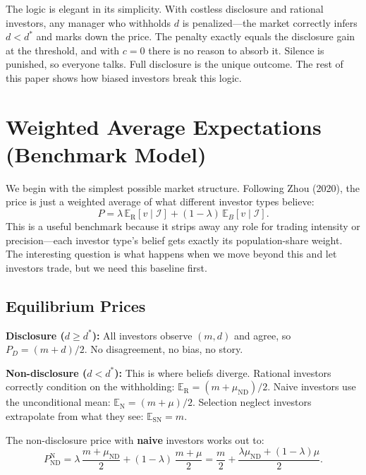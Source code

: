 \documentclass[12pt]{article}
\theoremstyle{plain}
\theoremstyle{definition}
\newcommand{\E}{\mathbb{E}}
\newcommand{\ND}{\mathrm{ND}}
\newcommand{\R}{\mathrm{R}}
\newcommand{\SN}{\mathrm{SN}}
\newcommand{\N}{\mathrm{N}}
\begin{document}
The logic is elegant in its simplicity. With costless disclosure and rational investors, any manager who withholds $d$ is penalized---the market correctly infers $d < d^*$ and marks down the price. The penalty exactly equals the disclosure gain at the threshold, and with $c = 0$ there is no reason to absorb it. Silence is punished, so everyone talks. Full disclosure is the unique outcome. The rest of this paper shows how biased investors break this logic.


\section{Weighted Average Expectations (Benchmark Model)}
\label{sec:weighted_avg}

We begin with the simplest possible market structure. Following Zhou (2020), the price is just a weighted average of what different investor types believe:
\begin{equation}
P = \lambda \, \E_\R[v \mid \mathcal{I}] + (1 - \lambda) \, \E_B[v \mid \mathcal{I}].
\label{eq:wa_price}
\end{equation}
This is a useful benchmark because it strips away any role for trading intensity or precision---each investor type's belief gets exactly its population-share weight. The interesting question is what happens when we move beyond this and let investors trade, but we need this baseline first.

\subsection{Equilibrium Prices}

\textbf{Disclosure ($d \geq d^*$):} All investors observe $(m, d)$ and agree, so $P_D = (m + d)/2$. No disagreement, no bias, no story.

\textbf{Non-disclosure ($d < d^*$):} This is where beliefs diverge. Rational investors correctly condition on the withholding: $\E_\R = (m + \mu_{\ND})/2$. Naive investors use the unconditional mean: $\E_\N = (m + \mu)/2$. Selection neglect investors extrapolate from what they see: $\E_\SN = m$.

The non-disclosure price with \textbf{naive} investors works out to:
\begin{equation}
P_{\ND}^\N = \lambda\,\frac{m + \mu_{\ND}}{2} + (1-\lambda)\,\frac{m + \mu}{2} = \frac{m}{2} + \frac{\lambda\mu_{\ND} + (1-\lambda)\mu}{2}.
\label{eq:wa_nd_naive}
\end{equation}
\end{document}
